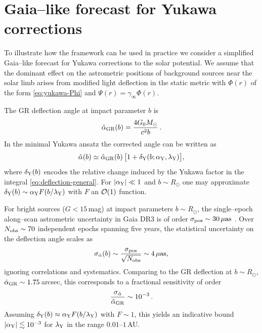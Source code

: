 \documentclass[11pt,a4paper]{article}
\begin{document}
\section{Gaia--like forecast for Yukawa corrections}
\label{sec:gaia}

To illustrate how the framework can be used in practice we consider a simplified Gaia--like forecast for Yukawa corrections to the solar potential. We assume that the dominant effect on the astrometric positions of background sources near the solar limb arises from modified light deflection in the static metric with $\Phi(r)$ of the form \eqref{eq:yukawa-Phi} and $\Psi(r)=\gamma_\infty\Phi(r)$.

The GR deflection angle at impact parameter $b$ is
\begin{equation}
\hat{\alpha}_{\rm GR}(b) = \frac{4G_0M_\odot}{c^2 b}\,.
\end{equation}
In the minimal Yukawa ansatz the corrected angle can be written as
\begin{equation}
\hat{\alpha}(b) \simeq \hat{\alpha}_{\rm GR}(b)\,\bigl[1 + \delta_{\rm Y}(b;\alpha_{\rm Y},\lambda_{\rm Y})\bigr],
\end{equation}
where $\delta_{\rm Y}(b)$ encodes the relative change induced by the Yukawa factor in the integral \eqref{eq:deflection-general}. For $|\alpha_{\rm Y}|\ll 1$ and $b\sim R_\odot$ one may approximate $\delta_{\rm Y}(b)\sim \alpha_{\rm Y} F(b/\lambda_{\rm Y})$ with $F$ an ${\cal O}(1)$ function.

For bright sources ($G<15$\,mag) at impact parameters $b\sim R_\odot$, the single--epoch along--scan astrometric uncertainty in Gaia DR3 is of order $\sigma_{\rm pos}\sim 30\,\mu{\rm as}$ \cite{GaiaDR3}. Over $N_{\rm obs}\sim 70$ independent epochs spanning five years, the statistical uncertainty on the deflection angle scales as
\begin{equation}
\sigma_{\hat{\alpha}}(b)\sim \frac{\sigma_{\rm pos}}{\sqrt{N_{\rm obs}}}\sim 4\,\mu{\rm as},
\end{equation}
ignoring correlations and systematics. Comparing to the GR deflection at $b\sim R_\odot$, $\hat{\alpha}_{\rm GR}\sim 1.75$\,arcsec, this corresponds to a fractional sensitivity of order
\begin{equation}
\frac{\sigma_{\hat{\alpha}}}{\hat{\alpha}_{\rm GR}} \sim 10^{-3}\,.
\end{equation}
Assuming $\delta_{\rm Y}(b)\approx \alpha_{\rm Y}F(b/\lambda_{\rm Y})$ with $F\sim 1$, this yields an indicative bound $|\alpha_{\rm Y}|\lesssim 10^{-3}$ for $\lambda_{\rm Y}$ in the range $0.01$--$1$\,AU.
\end{document}

